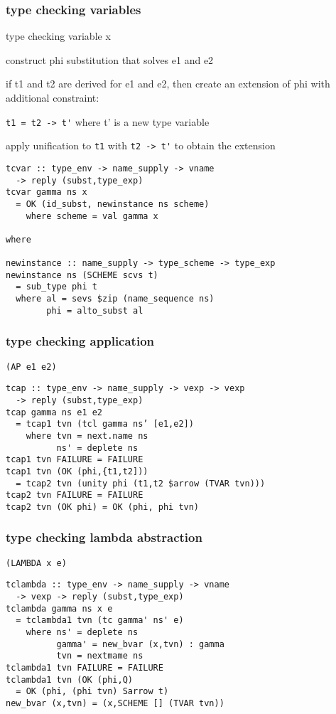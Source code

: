 \documentclass[8pt]{extarticle}
\begin{document}
\begin{multicols*}{2}
\subsubsection{type checking variables}

type checking variable x

construct phi substitution that solves e1 and e2

if t1 and t2 are derived for e1 and e2, then create an extension of phi with additional constraint:

\verb|t1 = t2 -> t'| where t' is a new type variable

apply unification to \verb|t1| with \verb|t2 -> t'| to obtain the extension

\begin{verbatim}
tcvar :: type_env -> name_supply -> vname
  -> reply (subst,type_exp)
tcvar gamma ns x
  = OK (id_subst, newinstance ns scheme)
    where scheme = val gamma x

where

newinstance :: name_supply -> type_scheme -> type_exp
newinstance ns (SCHEME scvs t)
  = sub_type phi t
  where al = sevs $zip (name_sequence ns)
        phi = alto_subst al
\end{verbatim}
\subsubsection{type checking application}

\verb|(AP e1 e2)|

\begin{verbatim}
tcap :: type_env -> name_supply -> vexp -> vexp
  -> reply (subst,type_exp)
tcap gamma ns e1 e2
  = tcap1 tvn (tcl gamma ns’ [e1,e2])
    where tvn = next.name ns
          ns' = deplete ns
tcap1 tvn FAILURE = FAILURE
tcap1 tvn (OK (phi,{t1,t2]))
  = tcap2 tvn (unity phi (t1,t2 $arrow (TVAR tvn)))
tcap2 tvn FAILURE = FAILURE
tcap2 tvn (OK phi) = OK (phi, phi tvn)
\end{verbatim}
\subsubsection{type checking lambda abstraction}

\verb|(LAMBDA x e)|

\begin{verbatim}
tclambda :: type_env -> name_supply -> vname
  -> vexp -> reply (subst,type_exp)
tclambda gamma ns x e
  = tclambda1 tvn (tc gamma' ns' e)
    where ns' = deplete ns
          gamma' = new_bvar (x,tvn) : gamma
          tvn = nextmame ns
tclambda1 tvn FAILURE = FAILURE
tclambda1 tvn (OK (phi,Q)
  = OK (phi, (phi tvn) Sarrow t)
new_bvar (x,tvn) = (x,SCHEME [] (TVAR tvn))
\end{verbatim}


\end{multicols*}
\end{document}
